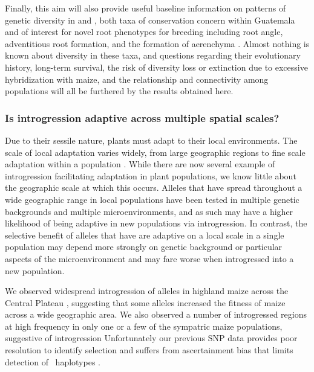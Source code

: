 Finally, this aim will also provide useful baseline information on patterns of genetic diversity in \zl{} and \zh, both taxa of conservation concern within Guatemala and of interest for novel root phenotypes for breeding including root angle, adventitious root formation, and the formation of aerenchyma \citep{omori2007qtl,mano2007breeding}. 
Almost nothing is known about diversity in these taxa, and questions regarding their evolutionary history, long-term survival, the risk of diversity loss or extinction due to excessive hybridization with maize, and the relationship and connectivity among populations will all be furthered by the results obtained here.

\subsubsection{Is introgression adaptive across multiple spatial scales?}
\label{sss:scale}

Due to their sessile nature, plants must adapt to their local environments. 
The scale of local adaptation varies widely, from large geographic regions \citep{lowry2010, fang2014} to fine scale adaptation within a population \citep{hamrick1979}.  
While there are now several example of introgression facilitating adaptation in plant populations, we know little about the geographic scale at which this occurs.
Alleles that have spread throughout a wide geographic range in local populations have been tested in multiple genetic backgrounds and multiple microenvironments, and as such may have a higher likelihood of being adaptive in new populations via introgression.
In contrast, the selective benefit of alleles that have are adaptive on a local scale in a single population may depend more strongly on genetic background or particular aspects of the microenvironment and may fare worse when introgressed into a new population. 

We observed widespread introgression of \zm{} alleles in highland maize across the Central Plateau \citep{Hufford2013}, suggesting that some \zm{} alleles increased the fitness of maize across a wide geographic area.  
We also observed a number of introgressed regions at high frequency in only one or a few of the sympatric maize populations, suggestive of introgression
Unfortunately our previous SNP data provides poor resolution to identify selection \citep{tiffin2014advances} and suffers from ascertainment bias that limits detection of \zm\ haplotypes \citep{Hufford2013}.  

